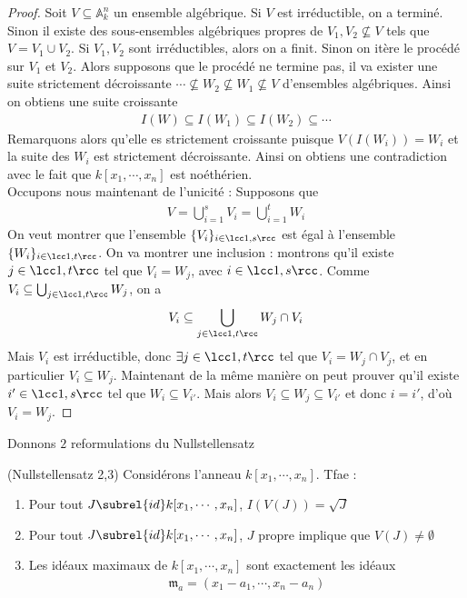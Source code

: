         \begin{proof}
            Soit $V \subseteq \mathbb{A}_k^n$ un ensemble algébrique. Si $V$ est irréductible, on a terminé. Sinon il existe des sous-ensembles algébriques propres de $V_1, V_2 \nsubseteq V$ tels que $V = V_1 \cup V_2$. Si $V_1,V_2$ sont irréductibles, alors on a finit. Sinon on itère le procédé sur $V_1$ et $V_2$. Alors supposons que le procédé ne termine pas, il va exister une suite strictement décroissante $\cdots \nsubseteq W_2 \nsubseteq W_1 \nsubseteq V$ d'ensembles algébriques. Ainsi on obtiens une suite croissante
            \begin{align*}
                I(W) \subseteq I(W_1) \subseteq I(W_2) \subseteq \cdots
            \end{align*}
            Remarquons alors qu'elle es strictement croissante puisque $V(I(W_i)) = W_i$ et la suite des $W_i$ est strictement décroissante. Ainsi on obtiens une contradiction avec le fait que $k[x_1, \cdots, x_n]$ est noéthérien. \\
            Occupons nous maintenant de l'unicité : Supposons que 
            \begin{align*}
                V = \bigcup_{i = 1}^s V_i = \bigcup_{i = 1}^t W_i
            \end{align*}
            On veut montrer que l'ensemble $\{V_i\}_{i \in \lcc 1,s \rcc}$ est égal à l'ensemble $\{W_i\}_{i \in \lcc 1,t \rcc}$. On va montrer une inclusion : montrons qu'il existe $j \in \lcc 1,t \rcc$ tel que $V_i = W_j$, avec $i \in \lcc 1,s \rcc$. Comme $V_i \subseteq \bigcup_{j \in \lcc 1,t \rcc} W_j$, on a
            \begin{align*}
                V_i \subseteq \bigcup_{j \in \lcc 1,t \rcc} W_j \cap V_i
            \end{align*}
            Mais $V_i$ est irréductible, donc $\exists j \in \lcc 1,t \rcc$ tel que $V_i = W_j \cap V_j$, et en particulier $V_i \subseteq W_j$. Maintenant de la même manière on peut prouver qu'il existe $i' \in \lcc 1,s \rcc$ tel que $W_i \subseteq V_{i'}$. Mais alors $V_i \subseteq W_j \subseteq V_{i'}$ et donc $i = i'$, d'où $V_i = W_j$.
        \end{proof}
        Donnons $2$ reformulations du Nullstellensatz
        \begin{prop} (Nullstellensatz 2,3)
            Considérons l'anneau $k[x_1, \cdots, x_n]$. Tfae :
            \begin{enumerate}
                \item Pour tout $J \subrel{id} k[x_1, \cdots, x_n]$, $I(V(J)) = \sqrt{J}$
                \item Pour tout $J \subrel{id} k[x_1, \cdots, x_n]$, $J$ propre implique que $V(J) \neq \emptyset$
                \item Les idéaux maximaux de $k[x_1, \cdots, x_n]$ sont exactement les idéaux
                \begin{align*}
                    \mathfrak{m}_a = (x_1 - a_1, \cdots, x_n - a_n)
                \end{align*}
            \end{enumerate}
        \end{prop}
